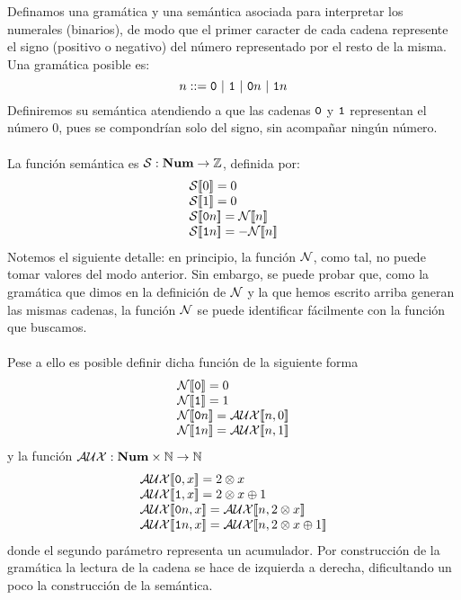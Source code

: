 \begin{example}
Definamos una gramática y una semántica asociada para interpretar los numerales (binarios), de modo que el primer caracter de cada cadena represente el signo (positivo o negativo) del número representado por el resto de la misma. Una gramática posible es:
\[
    n ::= \n{0}\ |\ \n{1} \ |\ \n{0}n \ |\ \n{1}n
\]
Definiremos su semántica atendiendo a que las cadenas $\texttt{0}$ y $\texttt{1}$ representan el número 0, pues se compondrían solo del signo, sin acompañar ningún número. \\ \\ 
La función semántica es $\mathcal{S}: \mathbf{Num} \rightarrow \mathbb{Z}$, definida por:
\[
    \begin{array}{l}
        \fc{S}{0} = 0\\
        \fc{S}{1} = 0 \\
         \fc{\mc{S}}{\n{0}n} = \fc{N}{n} \\
         \fc{\mc{S}}{\n{1}n} =-\fc{N}{n}\\
    \end{array}
\]
Notemos el siguiente detalle: en principio, la función $\mathcal{N}$, como tal, no puede tomar valores del modo anterior. Sin embargo, se puede probar que, como la gramática que dimos en la definición de $\mathcal{N}$ y la que hemos escrito arriba generan las mismas cadenas, la función $\mathcal{N}$ se puede identificar fácilmente con la función que buscamos. \\ \\
Pese a ello es posible definir dicha función de la siguiente forma
\[
    \begin{array}{l}
         \fc{N}{\n{0}} = 0 \\
         \fc{N}{\n{1}} = 1 \\
         \fc{N}{\n{0}n} = \fc{AUX}{n, 0} \\
         \fc{N}{\n{1}n} =  \fc{AUX}{n, 1} \\
    \end{array}
\]
y la función $\mathcal{AUX}: \mathbf{Num} \times \mathbb{N} \to \mathbb{N} $
\[
    \begin{array}{l}
         \fc{AUX}{\n{0}, x} = 2\otimes x \\
         \fc{AUX}{\n{1}, x} = 2\otimes x \oplus 1 \\
         \fc{AUX}{\n{0}n, x} = \fc{AUX}{n, 2\otimes x} \\
         \fc{AUX}{\n{1}n, x} =  \fc{AUX}{n, 2\otimes x \oplus 1} \\
    \end{array}
\]
donde el segundo parámetro representa un acumulador. Por construcción de la gramática la lectura de la cadena se hace de izquierda a derecha, dificultando un poco la construcción de la semántica.
\end{example}




